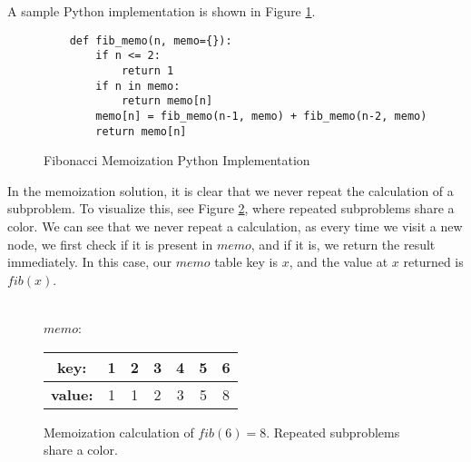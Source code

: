 A sample Python implementation is shown in Figure \ref{fig:fibonacci-memo}.

\begin{figure}[H]
    \centering
    \begin{lstlisting}
    def fib_memo(n, memo={}):
        if n <= 2:
            return 1
        if n in memo:
            return memo[n]
        memo[n] = fib_memo(n-1, memo) + fib_memo(n-2, memo)
        return memo[n]
    \end{lstlisting}
    \caption{Fibonacci Memoization Python Implementation}
    \label{fig:fibonacci-memo}
\end{figure}

In the memoization solution, it is clear that we never repeat the calculation of a subproblem.
To visualize this, see Figure \ref{fig:fibonacci-memo-tree}, where repeated subproblems share a color.
We can see that we never repeat a calculation, as every time we visit a new node, we first check if it is present in $memo$, and if it is, we return the result immediately.
In this case, our $memo$ table key is $x$, and the value at $x$ returned is $fib(x)$.

\begin{figure}[H]
    \centering
    \\
    $memo$:
    \begin{table}[H]
        \centering
        \begin{tabular}{|c|c|c|c|c|c|c|}
            \hline
            \textbf{key:} & 1 & 2 & 3 & 4 & 5 & 6 \\
            \hline
            \textbf{value:} & 1 & 1 & 2 & 3 & 5 & 8 \\
            \hline
        \end{tabular}
    \end{table}
    \caption{Memoization calculation of $fib(6) = 8$. Repeated subproblems share a color.}
    \label{fig:fibonacci-memo-tree}
\end{figure}

